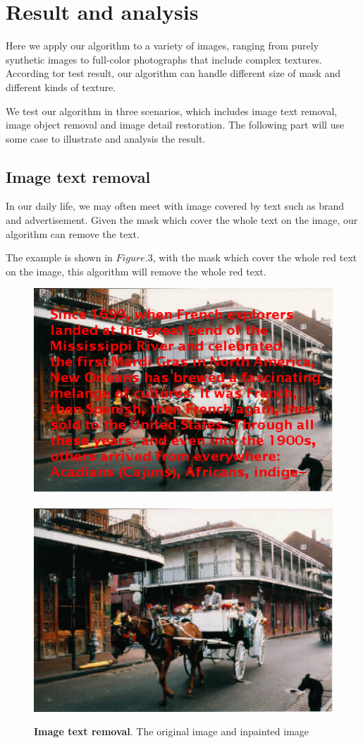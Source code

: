 \section{Result and analysis}
Here we apply our algorithm to a variety of images, ranging from purely synthetic images to full-color photographs that include complex textures. According tor test result, our algorithm can handle different size of mask and different kinds of texture.

We test our algorithm in three scenarios, which includes image text removal, image object removal and image detail restoration. The following part will use some case to illustrate and analysis the result.

\subsection*{Image text removal}
In our daily life, we may often meet with image covered by text such as brand and advertisement. Given the mask which cover the whole text on the image, our algorithm can remove the text.

The example is shown in $Figure.3$, with the mask which cover the whole red text on the image, this algorithm will remove the whole red text. 
\begin{figure}
	\centering
	\includegraphics[width=0.9\linewidth]{horse_car.png}\\\ \\
	\includegraphics[width=0.9\linewidth]{horse_car_result.png}
	\caption{\textbf{Image text removal}. The original image and inpainted image}
\end{figure}

